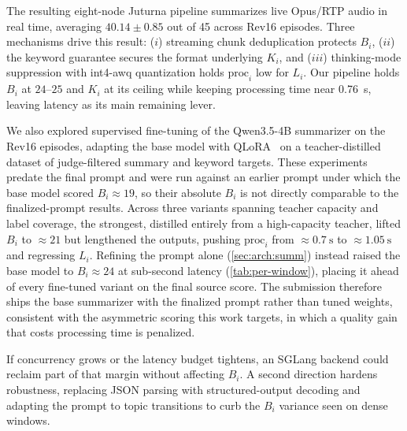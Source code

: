 \documentclass[conference,letterpaper]{IEEEtran}
\begin{document}
The resulting eight-node Juturna pipeline summarizes live Opus/RTP audio in real time, averaging $40.14 \pm 0.85$ out of \num{45} across Rev16 episodes.
Three mechanisms drive this result: ($i$) streaming chunk deduplication protects $B_i$, ($ii$) the keyword guarantee secures the format underlying $K_i$, and ($iii$) thinking-mode suppression with int4-\gls{awq} quantization holds $\text{proc}_i$ low for $L_i$.
Our pipeline holds $B_i$ at $24$--$25$ and $K_i$ at its ceiling while keeping processing time near \SI{0.76}{\second}, leaving latency as its main remaining lever.

We also explored supervised fine-tuning of the Qwen3.5-4B summarizer on the Rev16 episodes, adapting the base model with QLoRA~\cite{qlora} on a teacher-distilled dataset of judge-filtered summary and keyword targets.
These experiments predate the final prompt and were run against an earlier prompt under which the base model scored $B_i \approx \num{19}$, so their absolute $B_i$ is not directly comparable to the finalized-prompt results.
Across three variants spanning teacher capacity and label coverage, the strongest, distilled entirely from a high-capacity teacher, lifted $B_i$ to $\approx\num{21}$ but lengthened the outputs, pushing $\text{proc}_i$ from $\approx\SI{0.7}{\second}$ to $\approx\SI{1.05}{\second}$ and regressing $L_i$.
Refining the prompt alone (\cref{sec:arch:summ}) instead raised the base model to $B_i \approx \num{24}$ at sub-second latency (\cref{tab:per-window}), placing it ahead of every fine-tuned variant on the final source score.
The submission therefore ships the base summarizer with the finalized prompt rather than tuned weights, consistent with the asymmetric scoring this work targets, in which a quality gain that costs processing time is penalized.

If concurrency grows or the latency budget tightens, an SGLang backend could reclaim part of that margin without affecting $B_i$.
A second direction hardens robustness, replacing JSON parsing with structured-output decoding and adapting the prompt to topic transitions to curb the $B_i$ variance seen on dense windows.


\newpage


\end{document}
